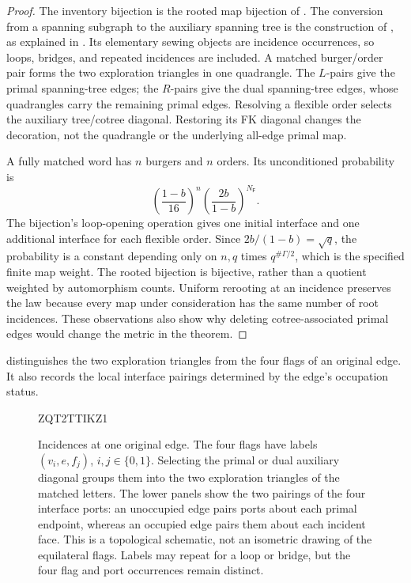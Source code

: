 \documentclass[11pt]{article}
\numberwithin{equation}{section}
\theoremstyle{definition}
\theoremstyle{remark}
\newcommand{\1}{\mathbf 1}
\begin{document}
\begin{proof}
The inventory bijection is the rooted map bijection of
\cite[Sections 4.1--4.2]{SheffieldInventory}.  The conversion from a
spanning subgraph to the auxiliary spanning tree is the construction of
\citet[Section~4]{Bernardi2008Subgraphs}, as explained in
\citet[Section~4.1]{SheffieldInventory}.  Its elementary sewing objects
are incidence occurrences, so loops, bridges, and repeated incidences are
included.  A matched burger/order pair forms the two exploration triangles
in one quadrangle.  The $L$-pairs give the primal spanning-tree edges;
the $R$-pairs give the dual spanning-tree edges, whose quadrangles carry the
remaining primal edges.  Resolving a flexible order selects the auxiliary
tree/cotree diagonal.  Restoring its FK diagonal changes the decoration,
not the quadrangle or the underlying all-edge primal map.

A fully matched word has $n$ burgers and $n$ orders.  Its unconditioned
probability is
\[
 \left(\frac{1-b}{16}\right)^n
 \left(\frac{2b}{1-b}\right)^{N_{\mathsf F}}.
\]
The bijection's loop-opening operation gives one initial interface and one
additional interface for each flexible order.  Since
$2b/(1-b)=\sqrt q$, the probability is a constant depending only on $n,q$
times $q^{\#\Gamma/2}$, which is the specified finite map weight.
The rooted bijection is bijective, rather than a quotient weighted by
automorphism counts.  Uniform rerooting at an incidence preserves the law
because every map under consideration has the same number of root
incidences.  These observations also show why deleting cotree-associated
primal edges would change the metric in the theorem.
\end{proof}

 distinguishes the two exploration triangles
from the four flags of an original edge.  It also records the local
interface pairings determined by the edge's occupation status.

\begin{figure}[ht]

\begingroup
ZQT2TTIKZ1
\endgroup

\caption{Incidences at one original edge.  The four flags have labels
$(v_i,e,f_j)$, $i,j\in\{0,1\}$.  Selecting the primal or dual auxiliary
diagonal groups them into the two exploration triangles of the matched
letters.  The lower panels show the two pairings of the four interface
ports: an unoccupied edge pairs ports about each primal endpoint,
whereas an occupied edge pairs them about each incident face.
This is a topological schematic, not an isometric drawing of the
equilateral flags.  Labels may repeat for a loop or bridge, but the
four flag and port occurrences remain distinct.}
\label{enc:flag-quadrangle}
\end{figure}
\end{document}
